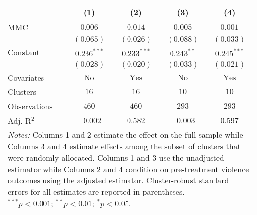 
\begin{tabular}{l c c c c}
\toprule
 & (1) & (2) & (3) & (4) \\
\midrule
MMC          & $0.006$       & $0.014$        & $0.005$       & $0.001$        \\
             & $(0.065)$     & $(0.026)$      & $(0.088)$     & $(0.033)$      \\
Constant     & $0.236^{***}$ & $0.233^{***}$  & $0.243^{**}$  & $0.245^{***}$  \\
             & $(0.028)$     & $(0.020)$      & $(0.033)$     & $(0.021)$      \\
\midrule
Covariates   & $\textrm{No}$ & $\textrm{Yes}$ & $\textrm{No}$ & $\textrm{Yes}$ \\
Clusters     & $16$          & $16$           & $10$          & $10$           \\
Observations & $460$         & $460$          & $293$         & $293$          \\
Adj. R$^2$   & $-0.002$      & $0.582$        & $-0.003$      & $0.597$        \\
\bottomrule
\multicolumn{5}{l}{\scriptsize{\parbox{.5\linewidth}{\vspace{2pt} 
       \textit{Notes:} Columns 1 and 2 estimate the effect on the full sample while Columns 3 
       and 4 estimate effects among the subset of clusters that were randomly allocated.
       Columns 1 and 3 use the unadjusted estimator while Columns 2 and 4 condition on 
       pre-treatment violence outcomes using the adjusted estimator. Cluster-robust 
       standard errors for all estimates are reported in parentheses. \\ $^{***}p<0.001$; $^{**}p<0.01$; $^{*}p<0.05$.}}}
\end{tabular}
